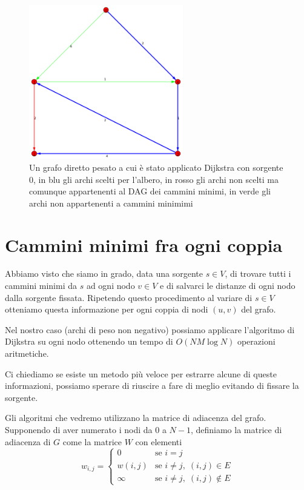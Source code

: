 \documentclass[a4paper,10pt]{amsbook}
\theoremstyle{plain}
\theoremstyle{definition}
\theoremstyle{remark}
\newcommand{\pa}[1]{\left(#1\right)}
\begin{document}
\begin{figure}[h]
  \centering
  \includegraphics[width=0.6\textwidth]{dijkstra}
  \caption{Un grafo diretto pesato a cui è stato applicato Dijkstra
    con sorgente $0$, in blu gli archi scelti per l'albero, in rosso gli
    archi non scelti ma comunque appartenenti al DAG dei cammini
    minimi, in verde gli archi non appartenenti a cammini minimimi}
  \label{fig:dijkstra}
\end{figure}


\section{Cammini minimi fra ogni coppia}

Abbiamo visto che siamo in grado, data una sorgente $s\in V$, di
trovare tutti i cammini minimi da $s$ ad ogni nodo $v\in V$ e di
salvarci le distanze di ogni nodo dalla sorgente fissata. Ripetendo
questo procedimento al variare di $s\in V$ otteniamo questa
informazione per ogni coppia di nodi $(u,v)$ del grafo.

Nel nostro caso (archi di peso non negativo) possiamo applicare
l'algoritmo di Dijkstra su ogni nodo ottenendo un tempo di $O(NM\log
N)$ operazioni aritmetiche.

Ci chiediamo se esiste un metodo più veloce per estrarre alcune di
queste informazioni, possiamo sperare di riuscire a fare di meglio
evitando di fissare la sorgente.

Gli algoritmi che vedremo utilizzano la matrice di adiacenza del
grafo. Supponendo di aver numerato i nodi da $0$ a $N-1$, definiamo la
matrice di adiacenza di $G$ come la matrice $W$ con elementi
\[
  w_{i,j} = \left\{
    \begin{matrix}
      0 & \text{se } i = j \\
      w\pa{i,j} & \text{se } i\neq j,\; (i,j) \in E \\
      \infty & \text{se } i\neq j,\; (i,j) \not\in E
    \end{matrix}
  \right.
\]
\end{document}
